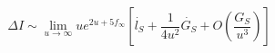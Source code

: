 \begin{equation}
\Delta I \sim \lim_{u \to \infty} u e^{2 u+5 f_{\infty}}
\left[\dot{l_S}+\frac{1}{4 u^2} \dot{G_S}+O
\left(\frac{G_S}{u^3}\right)\right]
\end{equation}

